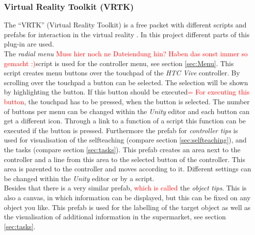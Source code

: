 	\subsubsection{Virtual Reality Toolkit (VRTK)}\label{sec:VRTK}
The ``VRTK'' (Virtual Reality Toolkit) is a free packet with different scripts and prefabs for interaction in the virtual reality \cite{asset_VRTK} \cite{VRTK}. In this project different parts of this plug-in are used.\\ 
The \textit{radial menu} \textcolor{red}{Muss hier noch ne Dateiendung hin? Haben das sonst immer so gemacht :)}script is used for the controller menu, see section \ref{sec:Menu}. This script creates menu buttons over the touchpad of the \textit{HTC Vive} controller. By scrolling over the touchpad a button can be selected. The selection will be shown by highlighting the button. If this button should be executed\textcolor{red}{= For executing this button}, the touchpad has to be pressed, when the button is selected. The number of buttons per menu can be changed within the \textit{Unity} editor and each button can get a different icon. Through a link to a function of a script this function can be executed if the button is pressed.
Furthermore the prefab for \textit{controller tips} is used for visualisation of the selfteaching (compare section \ref{sec:selfteaching}), and the tasks (compare section \ref{sec:tasks}). This prefab creates an area next to the controller and a line from this area to the selected button of the controller. This area is parented to the controller and moves according to it. Different settings can be changed within the \textit{Unity} editor or by a script.\\
Besides that there is a very similar prefab, \textcolor{red}{which is called }the \textit{object tips}. This is also a canvas, in which information can be displayed, but this can be fixed on any object you like. This prefab is used for the labelling of the target object as well as the visualisation of additional information in the supermarket, see section \ref{sec:tasks}.

	\newpage
